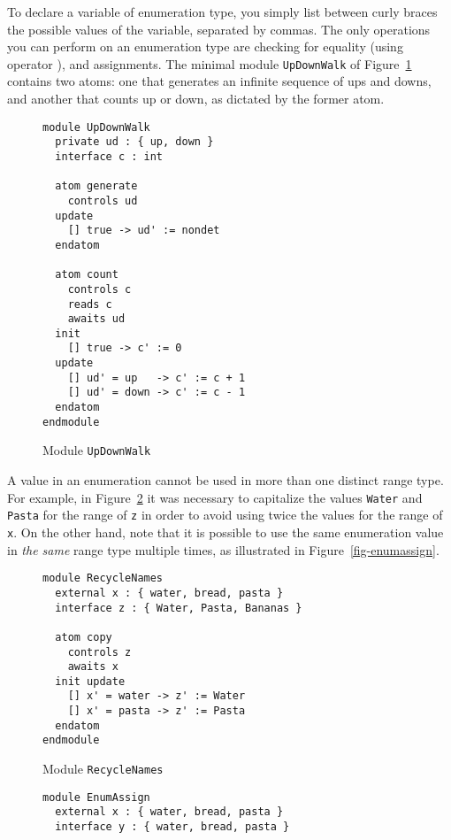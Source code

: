 {To declare a variable of enumeration type, you simply list between
curly braces the possible values of the variable, separated by commas.
The only operations you can perform on an enumeration type are
checking for equality (using operator \EQ), and assignments.  The
minimal module {\tt UpDownWalk} of Figure~\ref{fig-updownwalk}
contains two atoms: one that generates an infinite sequence of ups and
downs, and another that counts up or down, as dictated by the former
atom.

\begin{figure}
\begin{verbatim}
module UpDownWalk
  private ud : { up, down }
  interface c : int

  atom generate
    controls ud
  update
    [] true -> ud' := nondet
  endatom

  atom count
    controls c
    reads c
    awaits ud
  init
    [] true -> c' := 0
  update
    [] ud' = up   -> c' := c + 1
    [] ud' = down -> c' := c - 1
  endatom
endmodule
\end{verbatim}
\caption{Module {\tt UpDownWalk}}
\label{fig-updownwalk}
\end{figure}

A value in an enumeration cannot be used in more than one distinct
range type.  For example, in Figure~\ref{fig-recyclenames} it was
necessary to capitalize the values {\tt Water} and {\tt Pasta} for the
range of {\tt z} in order to avoid using twice the values for the
range of {\tt x}.  On the other hand, note that it is possible to use
the same enumeration value in {\em the same\/} range type multiple
times, as illustrated in Figure~\ref{fig-enumassign}. 

\begin{figure}
\begin{verbatim}
module RecycleNames
  external x : { water, bread, pasta } 
  interface z : { Water, Pasta, Bananas }

  atom copy 
    controls z
    awaits x
  init update 
    [] x' = water -> z' := Water
    [] x' = pasta -> z' := Pasta
  endatom
endmodule 
\end{verbatim}
\caption{Module {\tt RecycleNames}}
\label{fig-recyclenames}
\end{figure}

\begin{figure}
\begin{verbatim}
module EnumAssign
  external x : { water, bread, pasta } 
  interface y : { water, bread, pasta }


\end{verbatim}
\end{figure}}
